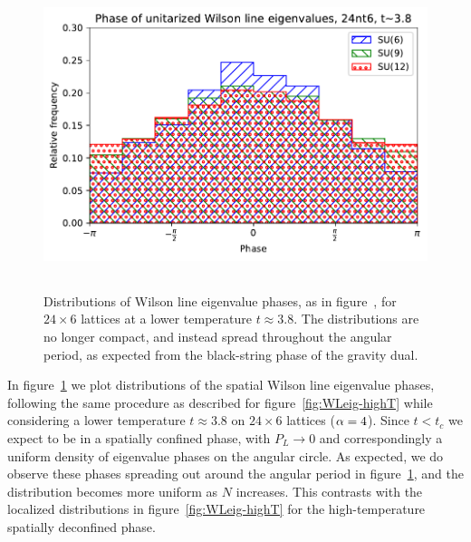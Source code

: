\begin{figure}[tbp]
  \centering
  \includegraphics[height=9cm]{Figures/WLeig-lowT.pdf}
  \caption{\label{fig:WLeig-lowT}Distributions of Wilson line eigenvalue phases, as in figure~\protect{\ref{fig:WLeig-highT}}, for $24\times 6$ lattices at a lower temperature $t \approx 3.8$.  The distributions are no longer compact, and instead spread throughout the angular period, as expected from the black-string phase of the gravity dual.}
\end{figure}

In figure~\ref{fig:WLeig-lowT} we plot distributions of the spatial Wilson line eigenvalue phases, following the same procedure as described for figure~\ref{fig:WLeig-highT} while considering a lower temperature $t \approx 3.8$ on $24\times 6$ lattices ($\alpha = 4$).
Since $t < t_c$ we expect to be in a spatially confined phase, with $P_L \to 0$ and correspondingly a uniform density of eigenvalue phases on the angular circle.
As expected, we do observe these phases spreading out around the angular period in figure~\ref{fig:WLeig-lowT}, and the distribution becomes more uniform as $N$ increases.
This contrasts with the localized distributions in figure~\ref{fig:WLeig-highT} for the high-temperature spatially deconfined phase.

